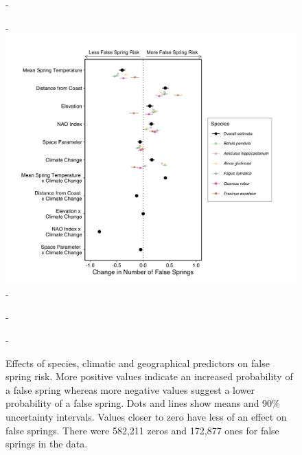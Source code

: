 \documentclass{article}\usepackage[]{graphicx}\usepackage[]{color}
\begin{document}
  
{\begin{figure} [H]
  -\begin{center}
  -\includegraphics[width=12cm]{..//analyses/figures/model_output_90_origspp.png}
  -\caption{Effects of species, climatic and geographical predictors on false spring risk. More positive values indicate an increased probability of a false spring whereas more negative values suggest a lower probability of a false spring. Dots and lines show means and 90\% uncertainty intervals. Values closer to zero have less of an effect on false springs. There were 582,211 zeros and 172,877 ones for false springs in the data.}\label{fig:maineffects}
  -\end{center}
  -\end{figure}}


  
\end{document}
